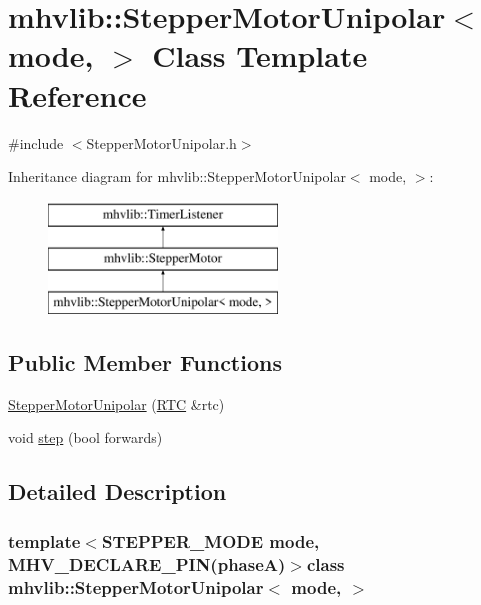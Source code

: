 \hypertarget{classmhvlib_1_1_stepper_motor_unipolar}{\section{mhvlib\-:\-:Stepper\-Motor\-Unipolar$<$ mode, $>$ Class Template Reference}
\label{classmhvlib_1_1_stepper_motor_unipolar}
}


{\ttfamily \#include $<$Stepper\-Motor\-Unipolar.\-h$>$}

Inheritance diagram for mhvlib\-:\-:Stepper\-Motor\-Unipolar$<$ mode, $>$\-:\begin{figure}[H]
\begin{center}
\leavevmode
\includegraphics[height=3.000000cm]{classmhvlib_1_1_stepper_motor_unipolar}
\end{center}
\end{figure}
\subsection*{Public Member Functions}
\begin{DoxyCompactItemize}
\item 
\hyperlink{classmhvlib_1_1_stepper_motor_unipolar_ab59690e98e306e7dab17ac2adb1f2abe}{Stepper\-Motor\-Unipolar} (\hyperlink{classmhvlib_1_1_r_t_c}{R\-T\-C} \&rtc)
\item 
void \hyperlink{classmhvlib_1_1_stepper_motor_unipolar_af9761218aaf3a24f90d950a121b7060c}{step} (bool forwards)
\end{DoxyCompactItemize}


\subsection{Detailed Description}
\subsubsection*{template$<$S\-T\-E\-P\-P\-E\-R\-\_\-\-M\-O\-D\-E mode, M\-H\-V\-\_\-\-D\-E\-C\-L\-A\-R\-E\-\_\-\-P\-I\-N(phase\-A)$>$class mhvlib\-::\-Stepper\-Motor\-Unipolar$<$ mode, $>$}


